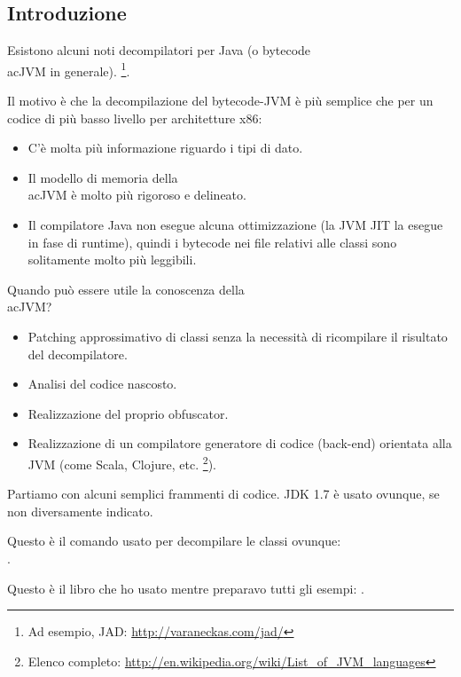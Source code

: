 \subsection{Introduzione}

\newcommand{\JADURL}{\url{http://varaneckas.com/jad/}}

Esistono alcuni noti decompilatori per Java (o bytecode \\ac{JVM} in generale).
\footnote{Ad esempio, JAD: \JADURL}.

Il motivo è che la decompilazione del bytecode-\ac{JVM} è più semplice 
che per un codice di più basso livello per architetture x86:

\begin{itemize}
\item C'è molta più informazione riguardo i tipi di dato.
\item Il modello di memoria della \\ac{JVM} è molto più rigoroso e delineato.
\item Il compilatore Java non esegue alcuna ottimizzazione (la \ac{JVM} \ac{JIT} la esegue in fase di runtime),
      quindi i bytecode nei file relativi alle classi sono solitamente molto più leggibili.
      
\end{itemize}

Quando può essere utile la conoscenza della \\ac{JVM}?

\newcommand{\URLListOfJVMLangs}{\url{http://en.wikipedia.org/wiki/List_of_JVM_languages}}

\begin{itemize}
\item Patching approssimativo di classi senza la necessità di ricompilare il risultato del decompilatore.
\item Analisi del codice nascosto.
\item Realizzazione del proprio obfuscator.
\item Realizzazione di un compilatore generatore di codice (back-end) orientata alla \ac{JVM} (come Scala, Clojure, etc.
      \footnote{Elenco completo: \URLListOfJVMLangs}).
      
\end{itemize}

Partiamo con alcuni semplici frammenti di codice.
JDK 1.7 è usato ovunque, se non diversamente indicato.

Questo è il comando usato per decompilare le classi ovunque:\\
.

Questo è il libro che ho usato mentre preparavo tutti gli esempi: \JavaBook.

